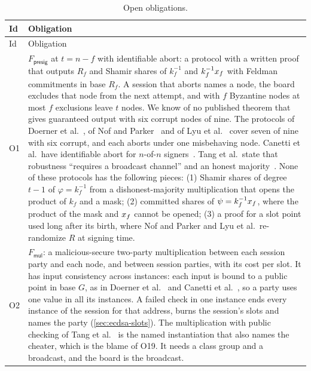 {\small
\setlength{\LTpre}{6pt}\setlength{\LTpost}{6pt}
\begin{longtable}{@{}>{\raggedright\arraybackslash}p{0.8cm}>{\raggedright\arraybackslash}p{13.5cm}@{}}
\caption{Open obligations.}\label{tab:open}\\
\toprule
Id & Obligation \\
\midrule
\endfirsthead
\toprule
Id & Obligation \\
\midrule
\endhead
\bottomrule
\endfoot
O1 & $F_{\mathsf{presig}}$ at $t = n - f$ with identifiable abort: a protocol with a written proof that outputs $R_f$ and Shamir shares of $k_f^{-1}$ and $k_f^{-1}x_{f}$ with Feldman commitments in base $R_f$. A session that aborts names a node, the board excludes that node from the next attempt, and with $f$ Byzantine nodes at most $f$ exclusions leave $t$ nodes. We know of no published theorem that gives guaranteed output with six corrupt nodes of nine. The protocols of Doerner et al.~\cite[Theorem~4.1]{DKLs23}, of Nof and Parker~\cite[Theorem~7]{TroutPP} and of Lyu et al.~\cite[Theorem~1]{LLZD25} cover seven of nine with six corrupt, and each aborts under one misbehaving node. Canetti et al.\ have identifiable abort for $n$-of-$n$ signers~\cite{CGGMP21}. Tang et al.\ state that robustness ``requires a broadcast channel'' and an honest majority~\cite{ARES}. None of these protocols has the following pieces: (1) Shamir shares of degree $t - 1$ of $\varphi = k_f^{-1}$ from a dishonest-majority multiplication that opens the product of $k_f$ and a mask; (2) committed shares of $\psi = k_f^{-1}x_{f}$, where the product of the mask and $x_{f}$ cannot be opened; (3) a proof for a slot point used long after its birth, where Nof and Parker and Lyu et al.\ re-randomize $R$ at signing time. \\
O2 & $F_{\mathsf{mul}}$: a malicious-secure two-party multiplication between each session party and each node, and between session parties, with its cost per slot. It has input consistency across instances: each input is bound to a public point in base $G$, as in Doerner et al.~\cite[Theorem~6.1]{DKLs23} and Canetti et al.~\cite{CGGMP21}, so a party uses one value in all its instances. A failed check in one instance ends every instance of the session for that address, burns the session's slots and names the party (\cref{sec:ecdsa-slots}). The multiplication with public checking of Tang et al.~\cite[Theorem~5]{ARES} is the named instantiation that also names the cheater, which is the blame of O19. It needs a class group and a broadcast, and the board is the broadcast. \\

\end{longtable}}
